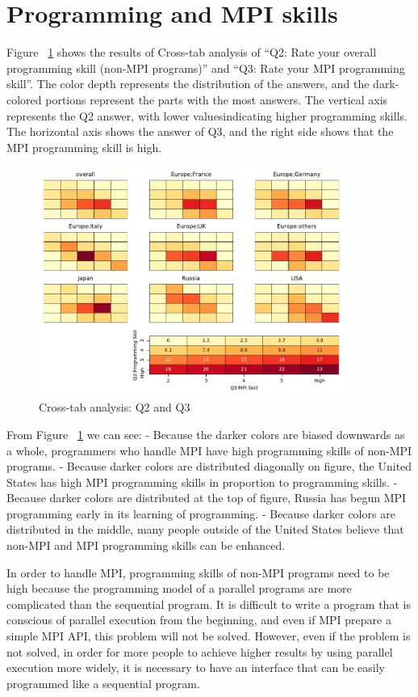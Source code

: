 \section{Programming and MPI skills}

Figure ~\ref{fig:Q2-Q3X} shows the results of Cross-tab analysis of “Q2: Rate your overall programming skill (non-MPI programs)” and “Q3: Rate your MPI programming skill”. The color depth represents the distribution of the answers, and the dark-colored portions represent the parts with the most answers. The vertical axis represents the Q2 answer, with lower valuesindicating higher programming skills. The horizontal axis shows the answer of Q3, and the right side shows that the MPI programming skill is high.

\begin{figure}[htb]
\begin{center}
\includegraphics[width=10cm]{../pdfs/Q2-Q3.pdf}
\caption{Cross-tab analysis: Q2 and Q3}
\label{fig:Q2-Q3X}
\end{center}
\end{figure}

From Figure ~\ref{fig:Q2-Q3X} we can see:
- Because the darker colors are biased downwards as a whole, programmers who handle MPI have high programming skills of non-MPI programs.
- Because darker colors are distributed diagonally on figure, the United States has high MPI programming skills in proportion to programming skills.
- Because darker colors are distributed at the top of figure, Russia has begun MPI programming early in its learning of programming.
- Because darker colors are distributed in the middle, many people outside of the United States believe that non-MPI and MPI programming skills can be enhanced.

In order to handle MPI, programming skills of non-MPI programs need to be high because the programming model of a parallel programs are more complicated than the sequential program. It is difficult to write a program that is conscious of parallel execution from the beginning, and even if MPI prepare a simple MPI API, this problem will not be solved. However, even if the problem is not solved, in order for more people to achieve higher results by using parallel execution more widely, it is necessary to have an interface that can be easily programmed like a sequential program.

